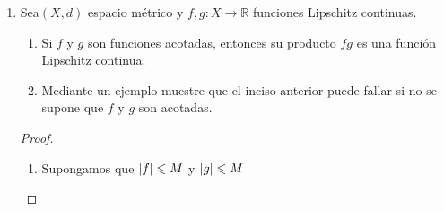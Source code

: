 \documentclass[12pt]{article}
\newcommand\R{\ensuremath{\mathbb{R}}}
\begin{document}
\begin{enumerate}[label=\textbf{\arabic*}.]
\begin{proof}
\begin{enumerate}
        Como $\Phi$ es continua en $x_0 \: \exists \: \delta$ tal que si

        $$d_X(x,x_0) < \delta \Rightarrow d(\Phi(x),\Phi(x_0))$$
        $$\Rightarrow \text{ si } d_X(x,x_0) < \delta \Rightarrow d_Z(\Psi(\Phi(x)), \Psi(\Phi(x_0)))$$

        Esto satisface la definición de continuidad.

        \item Si $\Phi$ es un homeomorfismo, ${\Phi}^{-1}$ es continua, y por el inciso anterior sabemos que si  $\Psi \circ \Phi $ es continua $\Rightarrow (\Psi \circ \Phi ) \circ {\Phi}^{-1}$ es continua.
        \item Es análogo al anterior. 
    \end{enumerate}
\end{proof}

\begin{proof}
    Demostremos ahora el inciso anterior. Sea $\Phi$ la identidad de ${\R}^{n}_{p}$ a $\R^n$ 

    $$ \Phi: (\R^n, {\norm{\cdot}}_{p}) \to (\R^n, {\norm{\cdot}}_{1}) $$
    
    y sea $\Psi$ la identidad de ${\R}^{m}$ a ${\R}^{m}_{r}$

    $$ \Psi: (\R^m, {\norm{\cdot}}_{1}) \to (\R^m, {\norm{\cdot}}_{r}) $$

    Sabemos que $\Phi$ y $\Psi$ son homeomorfismos. Esto implica que son continuas. Supongamos otra función continua $f : \R^n \to \R^m$, por el Lema anterior, sabemos que $f = f \circ \Phi : {\R}^{n}_{p} \to \R^m$ es continua. Además, por el mismo Lema, se tiene que $f = \Psi \circ f : {\R}^{n}_{p} \to {\R}^{m}_{r}$ es una función continua. 
\end{proof}

\item Sea$ (X, d)$ espacio métrico y $f,g : X \to \R$ funciones Lipschitz continuas.

\begin{enumerate}
    \item Si $f$ y $g$ son funciones acotadas, entonces su producto $fg$ es una función Lipschitz continua.
    \item Mediante un ejemplo muestre que el inciso anterior puede fallar si no se supone que $f$ y $g$ son acotadas.
\end{enumerate}

\begin{proof}
    \begin{enumerate}
        \item Supongamos que $\abs{f} \leqslant M$ y $\abs{g} \leqslant M$


\end{enumerate}
\end{proof}
\end{enumerate}
\end{document}
